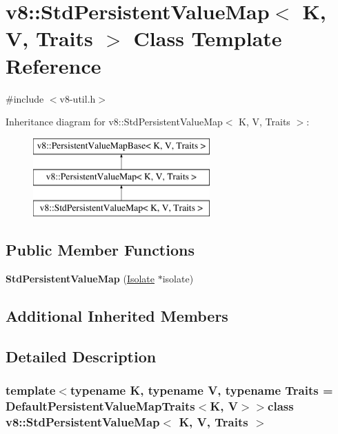 \hypertarget{classv8_1_1StdPersistentValueMap}{}\section{v8\+:\+:Std\+Persistent\+Value\+Map$<$ K, V, Traits $>$ Class Template Reference}
\label{classv8_1_1StdPersistentValueMap}


{\ttfamily \#include $<$v8-\/util.\+h$>$}

Inheritance diagram for v8\+:\+:Std\+Persistent\+Value\+Map$<$ K, V, Traits $>$\+:\begin{figure}[H]
\begin{center}
\leavevmode
\includegraphics[height=3.000000cm]{classv8_1_1StdPersistentValueMap}
\end{center}
\end{figure}
\subsection*{Public Member Functions}
\begin{DoxyCompactItemize}
\item 
\hypertarget{classv8_1_1StdPersistentValueMap_a44d7222a863267780db07c882056f73b}{}{\bfseries Std\+Persistent\+Value\+Map} (\hyperlink{classv8_1_1Isolate}{Isolate} $\ast$isolate)\label{classv8_1_1StdPersistentValueMap_a44d7222a863267780db07c882056f73b}

\end{DoxyCompactItemize}
\subsection*{Additional Inherited Members}


\subsection{Detailed Description}
\subsubsection*{template$<$typename K, typename V, typename Traits = Default\+Persistent\+Value\+Map\+Traits$<$\+K, V$>$$>$class v8\+::\+Std\+Persistent\+Value\+Map$<$ K, V, Traits $>$}

